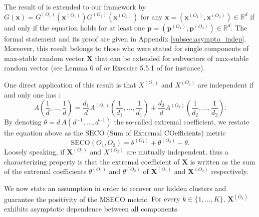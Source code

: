 \documentclass[11pt]{article}
\newcommand{\SECO}{\mathrm{SECO}}
\newenvironment{Assumption}[1]
  {\renewcommand\theinnerassumption{#1}\innerassumption}
  {\endinnerassumption}
\begin{document}
	 The result of \cite{takahashi1994asymptotic} is extended to our framework by $G(\textbf{x}) = G^{(O_1)}(\textbf{x}^{(O_1)}) G^{(O_2)}(\textbf{x}^{(O_2)})$ for any $\textbf{x} = (\textbf{x}^{(O_1)}, \textbf{x}^{(O_2)}) \in \mathbb{R}^d$ if and only if the equation holds for at least one $\textbf{p} = (\textbf{p}^{(O_1)}, \textbf{p}^{(O_2)}) \in \mathbb{R}^d$. The formal statement and its proof are given in Appendix \ref{subsec:asympto_indep}. Moreover, this result belongs to those who were stated for single components of max-stable random vector $\textbf{X}$ that can be extended for subvectors of max-stable random vector (see Lemma 6 of \cite{papastathopoulos2016conditional} or Exercise 5.5.1 of \cite{resnick2008extreme} for instance).
	 
	  One direct application of this result is that $X^{(O_1)}$ and $X^{(O_2)}$ are independent if and only one has :
	\begin{equation*}
		A\left(\frac{1}{d}, \dots, \frac{1}{d}\right) = \frac{d_1}{d} A^{(O_1)}\left( \frac{1}{d_1}, \dots, \frac{1}{d_1} \right) + \frac{d_2}{d} A^{(O_2)}\left( \frac{1}{d_2}, \dots, \frac{1}{d_2} \right).
	\end{equation*}
	By denoting $\theta = d \, A (d^{-1}, \dots, d^{-1})$ the so-called extremal coefficient, we restate the equation above as the $\SECO$ (Sum of Extremal COefficients) metric
	\begin{equation}
		\SECO(O_1, O_2) = \theta^{(O_1)} + \theta^{(O_2)} - \theta.
	\end{equation}
	Loosely speaking, if $\textbf{X}^{(O_1)}$ and $X^{(O_2)}$ are mutually independent, thus a characterizing property is that the extremal coefficient of $\textbf{X}$ is written as the sum of the extremal coefficients $\theta^{(O_1)}$ and $\theta^{(O_2)}$ of $\textbf{X}^{(O_1)}$ and $\textbf{X}^{(O_2)}$ respectively.
	
	We now state an assumption in order to recover our hidden clusters and guarantee the positivity of the MSECO metric. 
	\begin{Assumption}
		A For every $k \in \{1,\dots, K\}$, $\textbf{X}^{(\bar{O}_k)}$ exhibits asymptotic dependence between all components.
		\label{ass:A}
	\end{Assumption}
	
\end{document}
